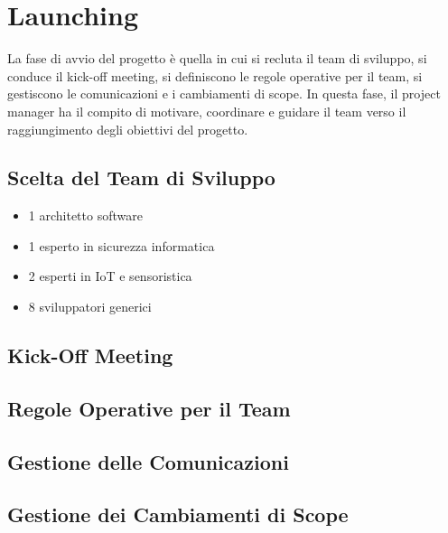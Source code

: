 \chapter{Launching}
La fase di avvio del progetto è quella in cui si recluta il team di sviluppo, si conduce il kick-off meeting, si definiscono le regole operative per il team, si gestiscono le comunicazioni e i cambiamenti di scope. In questa fase, il project manager ha il compito di motivare, coordinare e guidare il team verso il raggiungimento degli obiettivi del progetto.

\section{Scelta del Team di Sviluppo}

\begin{itemize}
    \item 1 architetto software
    \item 1 esperto in sicurezza informatica
    \item 2 esperti in IoT e sensoristica
    \item 8 sviluppatori generici
\end{itemize}

\section{Kick-Off Meeting}

\section{Regole Operative per il Team}

\section{Gestione delle Comunicazioni}

\section{Gestione dei Cambiamenti di Scope}
